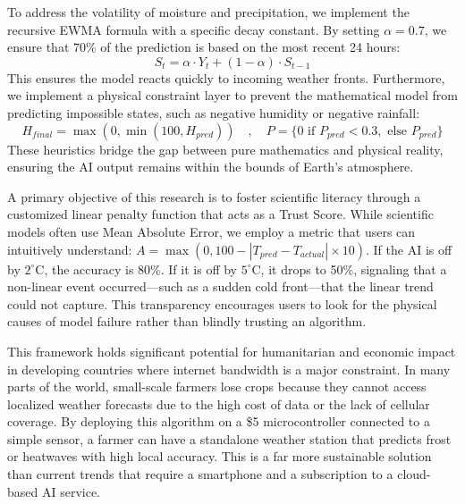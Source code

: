 \documentclass[14pt]{extarticle}
\begin{document}
\medskip

\noindent To address the volatility of moisture and precipitation, we implement the recursive EWMA formula with a specific decay constant. By setting $\alpha = 0.7$, we ensure that 70\% of the prediction is based on the most recent 24 hours:
\begin{equation}
S_t = \alpha \cdot Y_t + (1 - \alpha) \cdot S_{t-1}
\end{equation}
This ensures the model reacts quickly to incoming weather fronts. Furthermore, we implement a physical constraint layer to prevent the mathematical model from predicting impossible states, such as negative humidity or negative rainfall:
\begin{equation}
H_{final} = \max(0, \min(100, H_{pred})) \quad , \quad P = \{0 \text{ if } P_{pred} < 0.3, \text{ else } P_{pred}\}
\end{equation}
These heuristics bridge the gap between pure mathematics and physical reality, ensuring the AI output remains within the bounds of Earth's atmosphere.


\noindent A primary objective of this research is to foster scientific literacy through a customized linear penalty function that acts as a Trust Score. While scientific models often use Mean Absolute Error, we employ a metric that users can intuitively understand: $A = \max(0, 100 - |T_{pred} - T_{actual}| \times 10)$. If the AI is off by $2^\circ\text{C}$, the accuracy is 80\%. If it is off by $5^\circ\text{C}$, it drops to 50\%, signaling that a non-linear event occurred—such as a sudden cold front—that the linear trend could not capture. This transparency encourages users to look for the physical causes of model failure rather than blindly trusting an algorithm.

\medskip

\noindent This framework holds significant potential for humanitarian and economic impact in developing countries where internet bandwidth is a major constraint. In many parts of the world, small-scale farmers lose crops because they cannot access localized weather forecasts due to the high cost of data or the lack of cellular coverage. By deploying this algorithm on a \$5 microcontroller connected to a simple sensor, a farmer can have a standalone weather station that predicts frost or heatwaves with high local accuracy. This is a far more sustainable solution than current trends that require a smartphone and a subscription to a cloud-based AI service.
\end{document}
